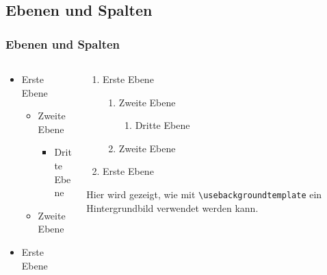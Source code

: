 \documentclass[t,aspectratio=169]{beamer}
\begin{document}
\subsection{Ebenen und Spalten} %

\begin{frame}[fragile]
	\frametitle{Ebenen und Spalten}
	\begin{columns}[T]
		\begin{column}{.47\textwidth}
			\begin{itemize}
				\item Erste Ebene
					\begin{itemize}
						\item Zweite Ebene
						\begin{itemize}
							\item Dritte Ebene
						\end{itemize}
						\item Zweite Ebene
					\end{itemize}
				\item Erste Ebene
			\end{itemize}
		\end{column}		
		\begin{column}{.47\textwidth}
			\begin{enumerate}	
				\item Erste Ebene
					\begin{enumerate}
						\item Zweite Ebene
						\begin{enumerate}
							\item Dritte Ebene
						\end{enumerate}
						\item Zweite Ebene
					\end{enumerate}
				\item Erste Ebene
			\end{enumerate}
			\vspace{0.5cm}
			\begin{block}{}
				Hier wird gezeigt, wie mit \verb|\usebackgroundtemplate| ein Hintergrundbild verwendet werden kann. 
			\end{block}
		\end{column}
	\end{columns}
\end{frame}
\end{document}
